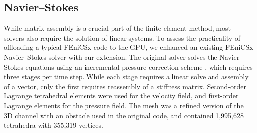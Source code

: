 \subsection*{Navier--Stokes}

While matrix assembly is a crucial part of the finite element method, most solvers also require the solution of linear systems. To assess the practicality of offloading a typical FEniCSx code to the GPU, we enhanced an existing FEniCSx Navier--Stokes solver \citep{dokkenipcs} with our extension. The original solver solves the Navier--Stokes equations using an incremental pressure correction scheme \citep{dokken2019shape}, which requires three stages per time step. While each stage requires a linear solve and assembly of a vector, only the first requires reassembly of a stiffness matrix. Second-order Lagrange tetrahedral elements were used for the velocity field, and first-order Lagrange elements for the pressure field. The mesh was a refined version of the 3D channel with an obstacle used in the original code, and contained 1,995,628 tetrahedra with 355,319 vertices.

